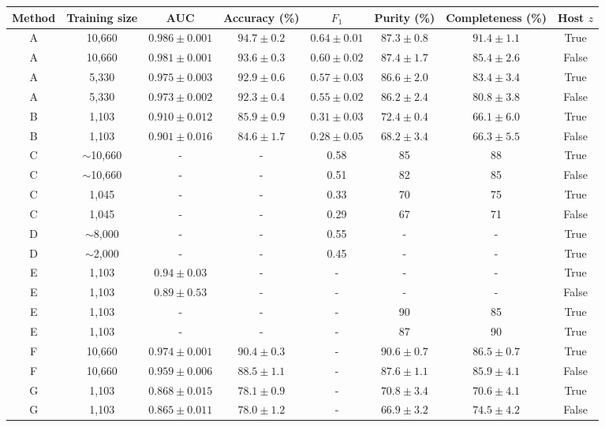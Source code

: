\documentclass[twocolumn]{aastex61}
\begin{document}
\begin{table}[t!]
\centering
\begin{tabular}{ c  c  c  c  c  c  c  c }\hline\hline
Method & Training size & AUC & Accuracy (\%) & $F_1$ & Purity (\%) & Completeness (\%) & Host $z$ \\\hline\hline
A & 10,660 & $0.986 \pm 0.001$ & $94.7 \pm 0.2$ & $0.64 \pm 0.01$ & $87.3 \pm 0.8$ & $91.4 \pm 1.1$ & True \\
A & 10,660 & $0.981 \pm 0.001$ & $93.6 \pm 0.3$ & $0.60 \pm 0.02$ & $87.4 \pm 1.7$ & $85.4 \pm 2.6$ & False \\
A & 5,330 & $0.975 \pm 0.003$ & $92.9 \pm 0.6$ & $0.57 \pm 0.03$ & $86.6\pm 2.0$ & $83.4 \pm 3.4$ & True \\
A & 5,330 & $0.973 \pm 0.002$ & $92.3 \pm 0.4$ & $0.55 \pm 0.02$ & $86.2 \pm 2.4$ & $80.8 \pm 3.8$ & False \\
B & 1,103 & $0.910 \pm 0.012$ & $85.9 \pm 0.9$ & $0.31 \pm 0.03$ & $72.4 \pm 0.4$ & $66.1 \pm 6.0$ & True \\
B & 1,103 & $0.901 \pm 0.016$ & $84.6 \pm 1.7$ & $0.28 \pm 0.05$ & $68.2 \pm 3.4$ & $66.3 \pm 5.5$ & False \\
C & $\sim$10,660 & - & - & 0.58 & 85 & 88 & True \\
C & $\sim$10,660 & - & - & 0.51 & 82 & 85 & False \\
C & 1,045 & - & - & 0.33 & 70 & 75 & True \\
C & 1,045 & - & - & 0.29 & 67 & 71 & False \\
D & $\sim$8,000 & - & - & 0.55 & - & - & True \\
D & $\sim$2,00$\underset{~}{0}$ & - & - & 0.45 & - & - & True \\
E & 1,103 & $0.94 \pm 0.03$ & - & - & - & - & True \\
E & 1,103 & $0.89 \pm 0.53$ & - & - & - & - & False \\
E & 1,103 & - & - & - & 90 & 85 & True\\
E & 1,103 & - & - & - & 87 & 90 & True\\
\hline\hline
F & 10,660 & $0.974 \pm 0.001$ & $90.4 \pm 0.3$ & - & $90.6 \pm 0.7$ & $86.5 \pm 0.7$ & True\\
F & 10,660 & $0.959 \pm 0.006$ & $88.5 \pm 1.1$ & - & $87.6 \pm 1.1$ & $85.9 \pm 4.1$ & False\\
G & 1,103 & $0.868 \pm 0.015$ & $78.1 \pm 0.9$ & - & $70.8 \pm 3.4$ & $70.6 \pm 4.1$ & True\\
G & 1,103 & $0.865 \pm 0.011$ & $78.0 \pm 1.2$ & - & $66.9 \pm 3.2$ & $74.5 \pm 4.2$ & False\\\hline\hline

\end{tabular}
\end{table}
\end{document}
